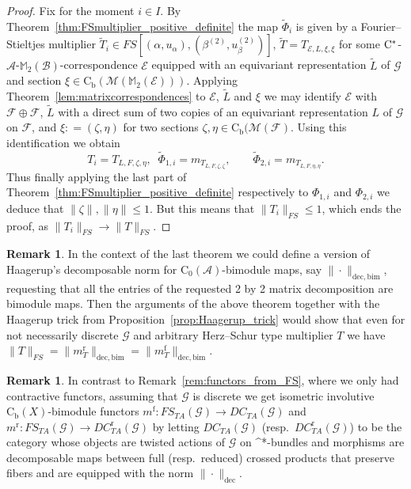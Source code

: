 \documentclass[11 pt, leqno]{amsart}
\numberwithin{equation}{section}
\theoremstyle{plain}
\theoremstyle{definition}
\newtheorem {rem} [thm]{Remark}
\newcommand{\Mat}{\mathbb M} %
\newcommand*{\contz}{\mathrm{C_0}}%
\newcommand*{\contb}{\mathrm{C_b}}%
\DeclareMathOperator{\rd}{r}%
\DeclareMathOperator{\f}{f}%
\newcommand{\B}{\mathcal B}
\newcommand{\M}{\mathcal M}
\newcommand{\m}{m}
\newcommand{\G}{\mathcal G} %
\newcommand{\EE}{\mathcal E}
\newcommand{\FF}{\mathcal F}
\newcommand{\A}{\mathcal A}
\newcommand{\cst}{\ifmmode\mathrm{C}^*\else{$\mathrm{C}^*$}\fi}
\begin{document}
\begin{proof}
Fix for the moment $i \in I$. 
By Theorem~\ref{thm:FSmultiplier_positive_definite} the map $\tilde{\Phi}_i$ is given by a Fourier--Stieltjes multiplier $\tilde{T}_i\in FS[(\alpha,u_{\alpha}),(\beta^{(2)},u_{\beta}^{(2)})]$, $\tilde{T}=T_{\EE,L,\xi,\xi}$ for some $\cst$-$\A$-$\Mat_2(\B)$-correspondence $\EE$ equipped with an equivariant representation $\tilde{L}$ of $\G$ and section $\xi\in \contb(\M(\Mat_2(\EE)))$. 
Applying Theorem~\ref{lem:matrixcorrespondences} to $\EE$, $\tilde{L}$ and $\xi$ we may identify $\EE$ with $\FF \oplus \FF$, $\tilde{L}$ with a direct sum of two copies of an equivariant representation $L$ of $\G$ on $\FF$, and $\xi: = (\zeta, \eta)$ for two sections $\zeta, \eta \in \contb(\M(\FF)$. 
Using this identification we obtain
\[ 
    T_i= T_{L, F, \zeta, \eta}, \;\; \tilde{\Phi}_{1,i} = m_{T_{L,F, \zeta, \zeta}}, \qquad \tilde{\Phi}_{2,i} = m_{T_{L,F, \eta, \eta}} .
\]
Thus finally applying the last part of Theorem~\ref{thm:FSmultiplier_positive_definite} respectively to $\Phi_{1,i}$ and $\Phi_{2,i}$ we deduce that $\|\zeta\|, \|\eta\|\leq 1$. 
But this means that $\|T_i\|_{FS} \leq 1$, which ends the proof, as $\|T_i\|_{FS}\to \|T\|_{FS}$.
\end{proof}


\begin{rem}\label{rem:decbim}
In the context of the last theorem we could define a version of Haagerup's decomposable norm for $\contz(\A)$-bimodule maps, say $\|\cdot\|_{\mathrm{dec},\mathrm{bim}}$, requesting that all the entries of the requested 2 by 2 matrix decomposition are bimodule maps. 
Then the arguments of the above theorem together with the Haagerup trick from Proposition~\ref{prop:Haagerup_trick} would show that even for not necessarily discrete $\G$ and arbitrary Herz--Schur type multiplier $T$ we have $\|T\|_{FS} = \| m_T^{\rd} \|_{\mathrm{dec}, \mathrm{bim}} = \| m_T^{\f} \|_{\mathrm{dec}, \mathrm{bim}}$. %
\end{rem}

\begin{rem}\label{rem:category_of_decomposables}
In contrast to Remark~\ref{rem:functors_from_FS}, where we only had contractive functors, assuming that $\G$ is discrete we get isometric involutive $\contb(X)$-bimodule functors $\m^{\f} : FS_{TA}(\G)\to DC_{TA}(\G)$ and $\m^{\rd} : FS_{TA}(\G)\to DC_{TA}^{\rd}(\G)$ by letting  $DC_{TA}(\G)$  (resp.\ $DC_{TA}^{\rd}(\G)$) to be the category whose objects are  twisted actions of $\G$ on \cst-bundles and morphisms are decomposable maps between full (resp.\ reduced) crossed products that preserve fibers and are equipped with the norm $\|\cdot\|_{\mathrm{dec}}$. 
\end{rem}
\end{document}
